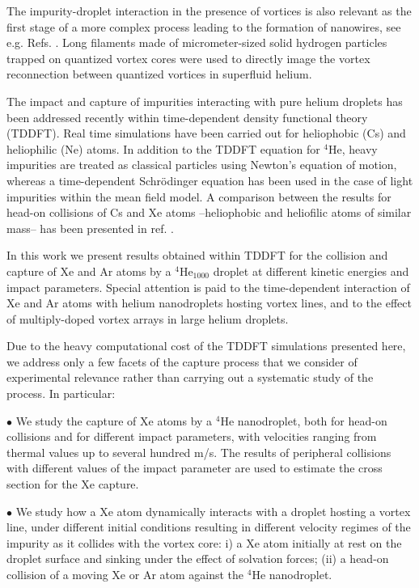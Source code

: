 		The impurity-droplet interaction in the presence of vortices is also relevant as the first stage of a more complex process leading to the formation of nanowires, see e.g. Refs. . Long filaments made of micrometer-sized solid hydrogen particles trapped on quantized vortex cores were used to directly image the vortex reconnection between quantized vortices in superfluid helium\citep{Bewley2008}.

		The impact and capture of impurities interacting with pure helium droplets has been addressed recently within time-dependent density functional theory (TDDFT).
Real time simulations have been carried out for 
heliophobic\citep{Lea14a} (Cs) and heliophilic\citep{Vil16b} (Ne) atoms. In addition to the 
TDDFT equation for $^4$He, heavy impurities are treated as 
classical particles using
Newton's equation of motion, whereas a time-dependent 
Schr\"odinger equation has been used in the case of  
light impurities within the mean field model.\citep{Her12a,Vil16b}  
A comparison between the results for head-on collisions of Cs and Xe 
atoms --heliophobic and heliofilic atoms of similar mass-- has been presented in ref. \citep{Cop16}.

In this work we present results obtained within TDDFT 
for the collision and capture of Xe and Ar atoms by a $^4$He$_{1000}$ 
droplet at different kinetic energies and impact parameters. Special attention is paid 
to the  time-dependent interaction of Xe and Ar atoms with 
helium nanodroplets hosting 
vortex lines, and to the effect of multiply-doped vortex arrays in large helium droplets.

Due to the heavy computational cost 
of the TDDFT simulations presented here, 
we  address only a few facets of the capture 
process that we consider of experimental relevance
rather than carrying out a systematic study of the process. In particular:

$\bullet$ We study the capture of Xe atoms by a $^4$He nanodroplet, both for head-on 
collisions and for different impact parameters,
with velocities ranging from thermal values up to several hundred m/s.
The results of peripheral collisions  
with different values of the impact parameter 
are used to estimate the cross section for the
Xe capture.
 
$\bullet$ We study how a Xe atom dynamically interacts with a 
droplet hosting a vortex line, under different initial conditions
resulting in different velocity regimes of the impurity as it 
collides with the vortex core:
i) a Xe atom initially at rest on the droplet surface and
sinking under the effect of solvation forces;
(ii) a head-on collision of a moving Xe or Ar atom  against the
$^4$He nanodroplet.

